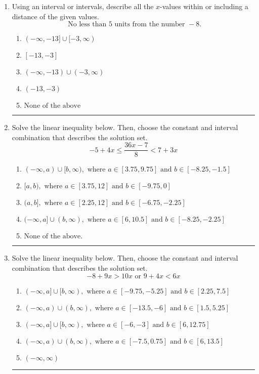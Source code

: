 \documentclass[14pt]{extbook}
\newcommand{\litem}[1]{\item#1\hspace*{-1cm}\rule{\textwidth}{0.4pt}}
\begin{document}
\begin{enumerate}
{\begin{enumerate}[label=\Alph*.]
\end{enumerate} }
\litem{
Using an interval or intervals, describe all the $x$-values within or including a distance of the given values.\[ \text{ No less than } 5 \text{ units from the number } -8. \]\begin{enumerate}[label=\Alph*.]
\item \( (-\infty, -13] \cup [-3, \infty) \)
\item \( [-13, -3] \)
\item \( (-\infty, -13) \cup (-3, \infty) \)
\item \( (-13, -3) \)
\item \( \text{None of the above} \)

\end{enumerate} }
\litem{
Solve the linear inequality below. Then, choose the constant and interval combination that describes the solution set.\[ -5 + 4 x \leq \frac{36 x - 7}{8} < 7 + 3 x \]\begin{enumerate}[label=\Alph*.]
\item \( (-\infty, a) \cup [b, \infty), \text{ where } a \in [3.75, 9.75] \text{ and } b \in [-8.25, -1.5] \)
\item \( [a, b), \text{ where } a \in [3.75, 12] \text{ and } b \in [-9.75, 0] \)
\item \( (a, b], \text{ where } a \in [2.25, 12] \text{ and } b \in [-6.75, -2.25] \)
\item \( (-\infty, a] \cup (b, \infty), \text{ where } a \in [6, 10.5] \text{ and } b \in [-8.25, -2.25] \)
\item \( \text{None of the above.} \)

\end{enumerate} }
\litem{
Solve the linear inequality below. Then, choose the constant and interval combination that describes the solution set.\[ -8 + 9 x > 10 x \text{ or } 9 + 4 x < 6 x \]\begin{enumerate}[label=\Alph*.]
\item \( (-\infty, a] \cup [b, \infty), \text{ where } a \in [-9.75, -5.25] \text{ and } b \in [2.25, 7.5] \)
\item \( (-\infty, a) \cup (b, \infty), \text{ where } a \in [-13.5, -6] \text{ and } b \in [1.5, 5.25] \)
\item \( (-\infty, a] \cup [b, \infty), \text{ where } a \in [-6, -3] \text{ and } b \in [6, 12.75] \)
\item \( (-\infty, a) \cup (b, \infty), \text{ where } a \in [-7.5, 0.75] \text{ and } b \in [6, 13.5] \)
\item \( (-\infty, \infty) \)


\end{enumerate}}
\end{enumerate}
\end{document}
